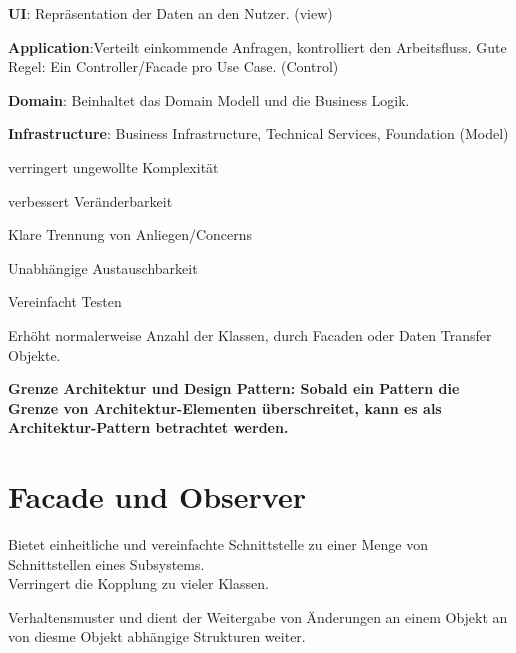 \begin{compactitem}
    \item \textbf{UI}: Repräsentation der Daten an den Nutzer. (view)
    \item \textbf{Application}:Verteilt einkommende Anfragen, kontrolliert
    den Arbeitsfluss. Gute Regel: Ein Controller/Facade pro Use Case. (Control)
    \item \textbf{Domain}: Beinhaltet das Domain Modell und die Business Logik.
    \item \textbf{Infrastructure}: Business Infrastructure, Technical Services,
    Foundation (Model)
\end{compactitem}

\begin{compactitem}
    \item verringert ungewollte Komplexität
    \item verbessert Veränderbarkeit
    \item Klare Trennung von Anliegen/Concerns
    \item Unabhängige Austauschbarkeit
    \item Vereinfacht Testen
\end{compactitem}
\begin{compactitem}
    \item Erhöht normalerweise Anzahl der Klassen, durch Facaden oder
    Daten Transfer Objekte.
\end{compactitem}


\textbf{Grenze Architektur und Design Pattern: Sobald ein Pattern die Grenze von
 Architektur-Elementen überschreitet, kann es als Architektur-Pattern betrachtet werden.
}

\section{Facade und Observer}
Bietet einheitliche und vereinfachte Schnittstelle zu einer Menge von
Schnittstellen eines Subsystems. \\
Verringert die Kopplung zu vieler Klassen.

Verhaltensmuster und dient der Weitergabe von Änderungen an einem Objekt an
von diesme Objekt abhängige Strukturen weiter.
